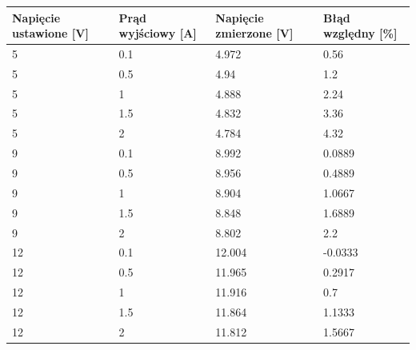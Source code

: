 \begin{table}[]
\centering
\begin{tabular}{|l|l|l|l|}
\hline
Napięcie ustawione {[}V{]} & Prąd wyjściowy {[}A{]} & Napięcie zmierzone {[}V{]} & Błąd względny {[}\%{]} \\ \hline
5                          & 0.1                    & 4.972                      & 0.56                   \\ \hline
5                          & 0.5                    & 4.94                       & 1.2                    \\ \hline
5                          & 1                      & 4.888                      & 2.24                   \\ \hline
5                          & 1.5                    & 4.832                      & 3.36                   \\ \hline
5                          & 2                      & 4.784                      & 4.32                   \\ \hline
9                          & 0.1                    & 8.992                      & 0.0889                 \\ \hline
9                          & 0.5                    & 8.956                      & 0.4889                 \\ \hline
9                          & 1                      & 8.904                      & 1.0667                 \\ \hline
9                          & 1.5                    & 8.848                      & 1.6889                 \\ \hline
9                          & 2                      & 8.802                      & 2.2                    \\ \hline
12                         & 0.1                    & 12.004                     & -0.0333                \\ \hline
12                         & 0.5                    & 11.965                     & 0.2917                 \\ \hline
12                         & 1                      & 11.916                     & 0.7                    \\ \hline
12                         & 1.5                    & 11.864                     & 1.1333                 \\ \hline
12                         & 2                      & 11.812                     & 1.5667                 \\ \hline

\end{tabular}
\end{table}
